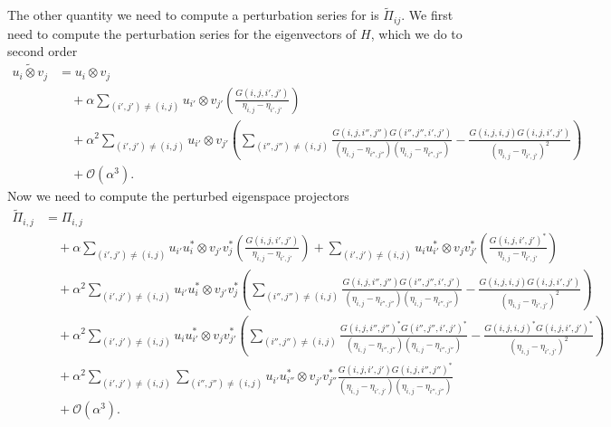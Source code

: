 \documentclass{article}
\newcommand{\parens}[1]{\left( #1 \right)}
\newcommand{\bigo}[1]{\mathcal{O}\left( #1 \right)}
\begin{document}
The other quantity we need to compute a perturbation series for is $\widetilde{\Pi}_{ij}$. We first need to compute the perturbation series for the eigenvectors of $H$, which we do to second order
\begin{align}
    \widetilde{u_i \otimes v_j} &= u_i \otimes v_j \\
    &\quad + \alpha \sum_{(i',j') \neq (i,j)} u_{i'} \otimes v_{j'} \parens{  \frac{G(i,j,i',j')}{\eta_{i,j} - \eta_{i',j'}} } \\
    &\quad + \alpha^2 \sum_{(i',j') \neq (i,j)} u_{i'} \otimes v_{j'} \parens{ \sum_{(i'',j'') \neq (i,j)} \frac{G(i,j,i'',j'') G(i'',j'',i',j')}{(\eta_{i,j} - \eta_{i'',j''})(\eta_{i,j} - \eta_{i'',j''})} -  \frac{G(i,j,i,j) G(i,j,i',j')}{(\eta_{i,j} - \eta_{i',j'})^2}} \\
    &\quad + \bigo{\alpha^3}.
\end{align}
Now we need to compute the perturbed eigenspace projectors
\begin{align}
    \widetilde{\Pi}_{i,j} &= \Pi_{i,j} \\
    & \quad + \alpha \sum_{(i',j') \neq (i,j)} u_{i'} u_i^* \otimes v_{j'} v_j^* \parens{  \frac{G(i,j,i',j')}{\eta_{i,j} - \eta_{i',j'}} } + \sum_{(i',j') \neq (i,j)} u_i u_{i'}^* \otimes v_j v_{j'}^* \parens{  \frac{G(i,j,i',j')^*}{\eta_{i,j} - \eta_{i',j'}} } \\
    & \quad + \alpha^2 \sum_{(i',j') \neq (i,j)} u_{i'} u_i^* \otimes v_{j'} v_j^* \parens{ \sum_{(i'',j'') \neq (i,j)} \frac{G(i,j,i'',j'') G(i'',j'',i',j')}{(\eta_{i,j} - \eta_{i'',j''})(\eta_{i,j} - \eta_{i'',j''})} -  \frac{G(i,j,i,j) G(i,j,i',j')}{(\eta_{i,j} - \eta_{i',j'})^2}} \\
    & \quad + \alpha^2 \sum_{(i',j') \neq (i,j)} u_i u_{i'}^* \otimes v_j v_{j'}^* \parens{ \sum_{(i'',j'') \neq (i,j)} \frac{G(i,j,i'',j'')^* G(i'',j'',i',j')^*}{(\eta_{i,j} - \eta_{i'',j''})(\eta_{i,j} - \eta_{i'',j''})} -  \frac{G(i,j,i,j)^* G(i,j,i',j')^*}{(\eta_{i,j} - \eta_{i',j'})^2}} \\
    & \quad + \alpha^2 \sum_{(i',j') \neq (i,j)} \sum_{(i'',j'') \neq (i,j)} u_{i'}u_{i''}^* \otimes v_{j'} v_{j''}^* \frac{G(i,j,i',j') G(i,j,i'',j'')^*}{(\eta_{i,j} - \eta_{i',j'})(\eta_{i,j} - \eta_{i'',j''})} \\
    & \quad + \bigo{\alpha^3}.
\end{align}
\end{document}
